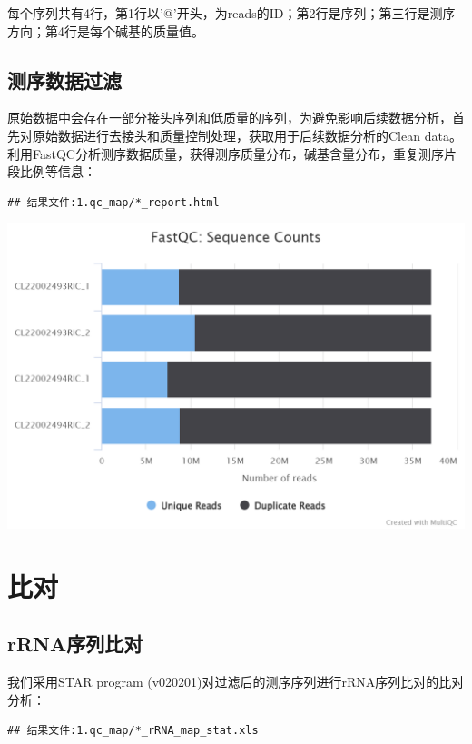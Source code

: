 \documentclass[
]{ctexart}
\begin{document}
每个序列共有4行，第1行以'@'开头，为reads的ID；第2行是序列；第三行是测序方向；第4行是每个碱基的质量值。

\hypertarget{ux6d4bux5e8fux6570ux636eux8fc7ux6ee4}{%
\subsection{测序数据过滤}\label{ux6d4bux5e8fux6570ux636eux8fc7ux6ee4}}

原始数据中会存在一部分接头序列和低质量的序列，为避免影响后续数据分析，首先对原始数据进行去接头和质量控制处理，获取用于后续数据分析的Clean data。利用FastQC分析测序数据质量，获得测序质量分布，碱基含量分布，重复测序片段比例等信息：

\begin{verbatim}
## 结果文件:1.qc_map/*_report.html
\end{verbatim}

\begin{center}\includegraphics[width=0.6\linewidth]{./1.picture/2.1.fastqc_sequence_counts_plot} \end{center}

\hypertarget{ux6bd4ux5bf9}{%
\section{比对}\label{ux6bd4ux5bf9}}

\hypertarget{rrnaux5e8fux5217ux6bd4ux5bf9}{%
\subsection{rRNA序列比对}\label{rrnaux5e8fux5217ux6bd4ux5bf9}}

我们采用STAR program (v020201)对过滤后的测序序列进行rRNA序列比对的比对分析：

\begin{verbatim}
## 结果文件:1.qc_map/*_rRNA_map_stat.xls
\end{verbatim}
\end{document}
